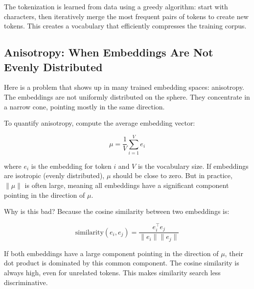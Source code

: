 \vspace{1em}

The tokenization is learned from data using a greedy algorithm: start with characters, then iteratively merge the most frequent pairs of tokens to create new tokens. This creates a vocabulary that efficiently compresses the training corpus.

\vspace{1.5em}

\subsection{Anisotropy: When Embeddings Are Not Evenly Distributed}

Here is a problem that shows up in many trained embedding spaces: anisotropy. The embeddings are not uniformly distributed on the sphere. They concentrate in a narrow cone, pointing mostly in the same direction.

To quantify anisotropy, compute the average embedding vector:

\begin{equation}
\mu = \frac{1}{V} \sum_{i=1}^V e_i
\end{equation}

where $e_i$ is the embedding for token $i$ and $V$ is the vocabulary size. If embeddings are isotropic (evenly distributed), $\mu$ should be close to zero. But in practice, $\|\mu\|$ is often large, meaning all embeddings have a significant component pointing in the direction of $\mu$.

\vspace{1em}

Why is this bad? Because the cosine similarity between two embeddings is:

\begin{equation}
\text{similarity}(e_i, e_j) = \frac{e_i^\top e_j}{\|e_i\| \|e_j\|}
\end{equation}

If both embeddings have a large component pointing in the direction of $\mu$, their dot product is dominated by this common component. The cosine similarity is always high, even for unrelated tokens. This makes similarity search less discriminative.

\vspace{1.5em}

